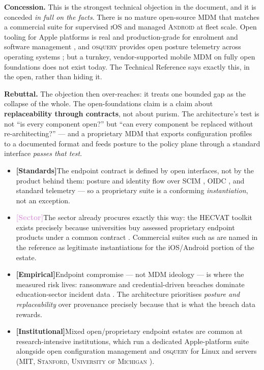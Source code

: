 \documentclass[11pt,a4paper,twoside]{book}
\let\citep\parencite
\newcommand{\keyword}[1]{\textbf{#1}}
\newcommand{\institution}[1]{\textsc{#1}}
\newcommand{\evstd}{\textcolor{NavyBlue}{\textbf{[Standards]}}\space}
\newcommand{\evsector}{\textcolor{Plum}{\textbf{[Sector]}}\space}
\newcommand{\evempirical}{\textcolor{OliveGreen}{\textbf{[Empirical]}}\space}
\newcommand{\evinst}{\textcolor{Slate}{\textbf{[Institutional]}}\space}
\begin{document}
\begin{answerbox}[Response O2.1]
\textbf{Concession.} This is the strongest technical objection in the
document, and it is conceded \emph{in full on the facts}. There is no mature
open-source MDM that matches a commercial suite for supervised
\institution{iOS} and managed \institution{Android} at fleet scale. Open
tooling for Apple platforms is real and production-grade for enrolment and
software management \citep{micromdm,munki}, and \institution{osquery}
provides open posture telemetry across operating systems
\citep{osquery}; but a turnkey, vendor-supported mobile MDM on fully open
foundations does not exist today. The Technical Reference says exactly this,
in the open, rather than hiding it.

\medskip
\textbf{Rebuttal.} The objection then over-reaches: it treats one bounded
gap as the collapse of the whole. The open-foundations claim is a claim
about \keyword{replaceability through contracts}, not about purism. The
architecture's test is not ``is every component open?'' but ``can every
component be replaced without re-architecting?'' --- and a proprietary MDM
that exports configuration profiles to a documented format and feeds posture
to the policy plane through a standard interface \emph{passes that test}.

\begin{itemize}[leftmargin=1.4em,itemsep=2pt]
  \item \evstd The endpoint contract is defined by open interfaces, not by
        the product behind them: posture and identity flow over
        \institution{SCIM} \citep{rfc-7643-scim-core}, \institution{OIDC}
        \citep{oidc-core-1.0}, and standard telemetry --- so a proprietary
        suite is a conforming \emph{instantiation}, not an exception.
  \item \evsector The sector already procures exactly this way: the
        \institution{HECVAT} toolkit exists precisely because universities
        buy assessed proprietary endpoint products under a common
        contract \citep{hecvat}. Commercial suites such as
        \citep{jamf,intune} are named in the reference as legitimate
        instantiations for the iOS/Android portion of the estate.
  \item \evempirical Endpoint compromise --- not MDM ideology --- is where
        the measured risk lives: ransomware and credential-driven breaches
        dominate education-sector incident data
        \citep{sophos-ransomware-edu2025,verizon-dbir2024}. The architecture
        prioritises \emph{posture and replaceability} over provenance
        precisely because that is what the breach data rewards.
  \item \evinst Mixed open/proprietary endpoint estates are common at
        research-intensive institutions, which run a dedicated Apple-platform suite
        alongside open configuration management and \institution{osquery}
        for Linux and servers (\institution{MIT}, \institution{Stanford},
        \institution{University of Michigan}
        \citep{mit-ist,stanford-uit,umich-safecomputing}).
\end{itemize}


\end{answerbox}
\end{document}
